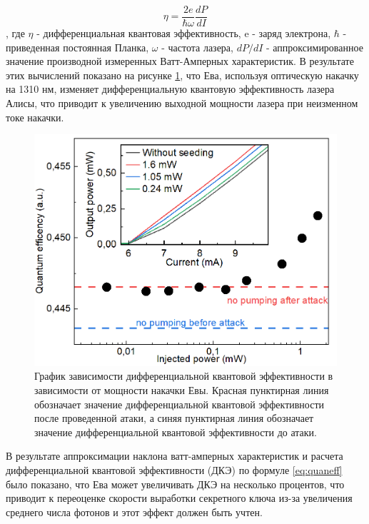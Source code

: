 \begin{equation}
\eta = \frac{2e}{\hbar\omega}\frac{dP}{dI}
\label{eq:quaneff}
\end{equation}, 
где $\eta$ - дифференциальная квантовая эффективность, e - заряд электрона, $\hbar$ - приведенная постоянная Планка, $\omega$ - частота лазера, $dP/dI$ - аппроксимированное значение производной измеренных Ватт-Амперных характеристик.
В результате этих вычислений показано на рисунке \ref{fig:diff quant eff ch4}, что Ева, используя оптическую накачку на 1310 нм, изменяет дифференциальную квантовую эффективность лазера Алисы, что приводит к увеличению выходной мощности лазера при неизменном токе накачки.
\begin{figure}
    \centering
    \includegraphics{images/Эффективность 1310.png}
    \caption{График зависимости дифференциальной квантовой эффективности в зависимости от мощности накачки Евы. Красная пунктирная линия обозначает значение дифференциальной квантовой эффективности после проведенной атаки, а синяя пунктирная линия обозначает значение дифференциальной квантовой эффективности до атаки.}
    \label{fig:diff quant eff ch4}
\end{figure}
В результате аппроксимации наклона ватт-амперных характеристик и расчета дифференциальной квантовой эффективности (ДКЭ) по формуле \ref{eq:quaneff} было показано, что Ева может увеличивать ДКЭ на несколько процентов, что приводит к переоценке скорости выработки секретного ключа из-за увеличения среднего числа фотонов и этот эффект должен быть учтен. 

